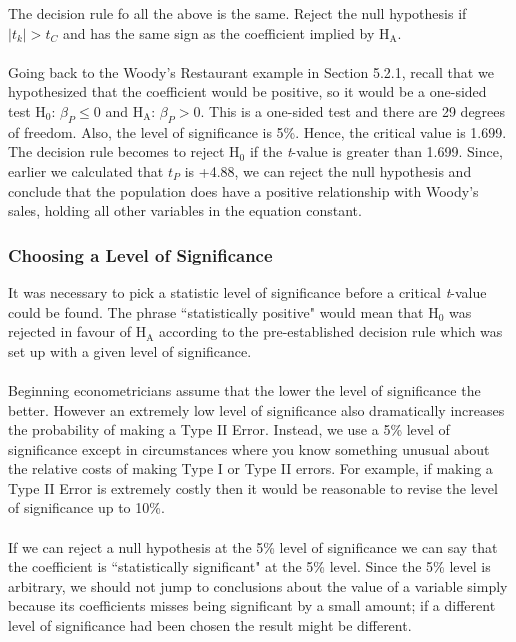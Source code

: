 \documentclass[11pt]{article}
\begin{document}
The decision rule fo all the above is the same. Reject the null hypothesis if $|t_k|>t_C$ and has the same sign as the coefficient implied by H$_\text{A}$.\\ \\
Going back to the Woody's Restaurant example in Section 5.2.1, recall that we hypothesized that the coefficient would be positive, so it would be a one-sided test $\text{H}_0\text{: }\beta_P \leq 0$ and $\text{H}_\text{A}\text{: } \beta_P > 0$. This is a one-sided test and there are 29 degrees of freedom. Also, the level of significance is 5\%. Hence, the critical value is 1.699. The decision rule becomes to reject H$_0$ if the \textit{t}-value is greater than 1.699. Since, earlier we calculated that $t_P$ is +4.88, we can reject the null hypothesis and conclude that the population does have a positive relationship with Woody's sales, holding all other variables in the equation constant.
\subsubsection{Choosing a Level of Significance}
It was necessary to pick a statistic level of significance before a critical \textit{t}-value could be found. The phrase ``statistically positive" would mean that H$_0$ was rejected in favour of H$_\text{A}$ according to the pre-established decision rule which was set up with a given level of significance.\\ \\
Beginning econometricians assume that the lower the level of significance the better. However an extremely low level of significance also dramatically increases the probability of making a Type II Error. Instead, we use a 5\% level of significance except in circumstances where you know something unusual about the relative costs of making Type I or Type II errors. For example, if making a Type II Error is extremely costly then it would be reasonable to revise the level of significance up to 10\%.\\ \\
If we can reject a null hypothesis at the 5\% level of significance we can say that the coefficient is ``statistically significant" at the 5\% level. Since the 5\% level is arbitrary, we should not jump to conclusions about the value of a variable simply because its coefficients misses being significant by a small amount; if a different level of significance had been chosen the result might be different.
\end{document}

